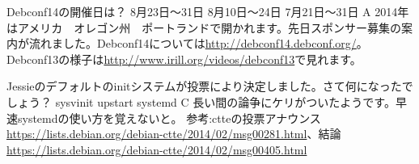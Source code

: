\santaku
{Debconf14の開催日は？}
{8月23日〜31日}
{8月10日〜24日}
{7月21日〜31日}
{A}
{2014年はアメリカ　オレゴン州　ポートランドで開かれます。先日スポンサー募集の案内が流れました。Debconf14については\url{http://debconf14.debconf.org/}。Debconf13の様子は\url{http://www.irill.org/videos/debconf13}で見れます。}

\santaku
{Jessieのデフォルトのinitシステムが投票により決定しました。さて何になったでしょう？}
{sysvinit}
{upstart}
{systemd}
{C}
{長い間の論争にケリがついたようです。早速systemdの使い方を覚えないと。
 参考:ctteの投票アナウンス\url{https://lists.debian.org/debian-ctte/2014/02/msg00281.html}、結論\url{https://lists.debian.org/debian-ctte/2014/02/msg00405.html}
}
